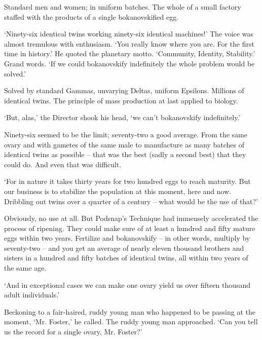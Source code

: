 \documentclass[10pt,a4paper]{article}
\newcommand{\sqm}[1]{‘#1’}
\begin{document}
Standard men and women; in uniform batches. The whole of a small factory staffed with the products of a single bokanovskified egg.

\sqm{Ninety-six identical twins working ninety-six identical machines!} The voice was almost tremulous with enthusiasm. \sqm{You really know where you are. For the first time in history.} He quoted the planetary motto. \sqm{Community, Identity, Stability.} Grand words. \sqm{If we could bokanovskify indefinitely the whole problem would be solved.}

Solved by standard Gammas, unvarying Deltas, uniform Epsilons. Millions of identical twins. The principle of mass production at last applied to biology.

\sqm{But, alas,} the Director shook his head, \sqm{we can't bokanovskify indefinitely.}

Ninety-six seemed to be the limit; seventy-two a good average. From the same ovary and with gametes of the same male to manufacture as many batches of identical twins as possible – that was the best (sadly a second best) that they could do. And even that was difficult.

\sqm{For in nature it takes thirty years for two hundred eggs to reach maturity. But our business is to stabilize the population at this moment, here and now. Dribbling out twins over a quarter of a century – what would be the use of that?}

Obviously, no use at all. But Podsnap's Technique had immensely accelerated the process of ripening. They could make sure of at least a hundred and fifty mature eggs within two years. Fertilize and bokanovskify – in other words, multiply by seventy-two – and you get an average of nearly eleven thousand brothers and sisters in a hundred and fifty batches of identical twins, all within two years of the same age.

\sqm{And in exceptional cases we can make one ovary yield us over fifteen thousand adult individuals.}

Beckoning to a fair-haired, ruddy young man who happened to be passing at the moment, \sqm{Mr. Foster,} he called. The ruddy young man approached. \sqm{Can you tell us the record for a single ovary, Mr. Foster?}
\end{document}
